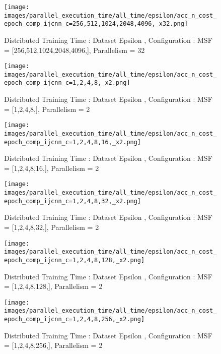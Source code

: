 \begin{figure*}[htbp]
\centering
\texttt{[image: images/parallel\_execution\_time/all\_time/epsilon/acc\_n\_cost\_epoch\_comp\_ijcnn\_c=256,512,1024,2048,4096,\_x32.png]}
\caption{Distributed Training Time : Dataset Epsilon , Configuration : MSF = [256,512,1024,2048,4096,], Parallelism = 32}
\label{fig:dis-msf-tr-time-epsilon-x32}
\end{figure*}


\begin{figure*}[htbp]
\centering
\texttt{[image: images/parallel\_execution\_time/all\_time/epsilon/acc\_n\_cost\_epoch\_comp\_ijcnn\_c=1,2,4,8,\_x2.png]}
\caption{Distributed Training Time : Dataset Epsilon , Configuration : MSF = [1,2,4,8,], Parallelism = 2}
\label{fig:dis-msf-tr-time-epsilon-x2}
\end{figure*}


\begin{figure*}[htbp]
\centering
\texttt{[image: images/parallel\_execution\_time/all\_time/epsilon/acc\_n\_cost\_epoch\_comp\_ijcnn\_c=1,2,4,8,16,\_x2.png]}
\caption{Distributed Training Time : Dataset Epsilon , Configuration : MSF = [1,2,4,8,16,], Parallelism = 2}
\label{fig:dis-msf-tr-time-epsilon-x2}
\end{figure*}


\begin{figure*}[htbp]
\centering
\texttt{[image: images/parallel\_execution\_time/all\_time/epsilon/acc\_n\_cost\_epoch\_comp\_ijcnn\_c=1,2,4,8,32,\_x2.png]}
\caption{Distributed Training Time : Dataset Epsilon , Configuration : MSF = [1,2,4,8,32,], Parallelism = 2}
\label{fig:dis-msf-tr-time-epsilon-x2}
\end{figure*}


\begin{figure*}[htbp]
\centering
\texttt{[image: images/parallel\_execution\_time/all\_time/epsilon/acc\_n\_cost\_epoch\_comp\_ijcnn\_c=1,2,4,8,128,\_x2.png]}
\caption{Distributed Training Time : Dataset Epsilon , Configuration : MSF = [1,2,4,8,128,], Parallelism = 2}
\label{fig:dis-msf-tr-time-epsilon-x2}
\end{figure*}


\begin{figure*}[htbp]
\centering
\texttt{[image: images/parallel\_execution\_time/all\_time/epsilon/acc\_n\_cost\_epoch\_comp\_ijcnn\_c=1,2,4,8,256,\_x2.png]}
\caption{Distributed Training Time : Dataset Epsilon , Configuration : MSF = [1,2,4,8,256,], Parallelism = 2}
\label{fig:dis-msf-tr-time-epsilon-x2}
\end{figure*}


